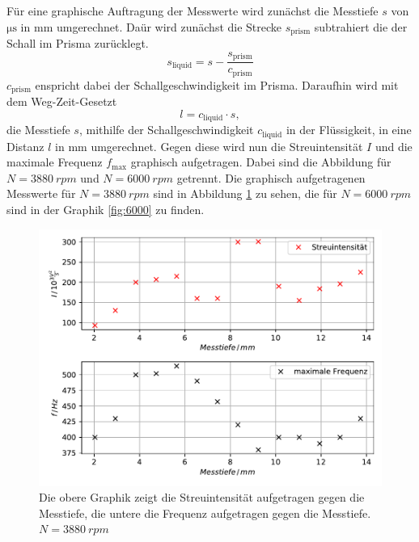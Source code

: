 Für eine graphische Auftragung der Messwerte wird zunächst die Messtiefe $s$ von $\si{\micro\second}$ in $\si{\milli\meter}$ umgerechnet.
Daür wird zunächst die Strecke $s_\text{prism}$ subtrahiert die der Schall im Prisma zurücklegt.
\begin{equation*}
 s_\text{liquid} = s - \frac{s_\text{prism}}{c_\text{prism}}
\end{equation*}
$c_\text{prism}$ enspricht dabei der Schallgeschwindigkeit im Prisma.
Daraufhin wird mit dem Weg-Zeit-Gesetzt
\begin{equation*}
l = c_\text{liquid} \cdot s,
\end{equation*}
die Messtiefe $s$, mithilfe der Schallgeschwindigkeit $c_\text{liquid}$ in der Flüssigkeit, in eine Distanz $l$ in $\si{\milli\meter}$ umgerechnet.
Gegen diese wird nun die Streuintensität $I$ und die maximale Frequenz $f_\text{max}$ graphisch aufgetragen.
Dabei sind die Abbildung für $N = \SI{3880}{rpm}$ und $N = \SI{6000}{rpm}$ getrennt.
Die graphisch aufgetragenen Messwerte für $N = \SI{3880}{rpm}$ sind in Abbildung \ref{fig:3880} zu sehen, die für $N = \SI{6000}{rpm}$ sind in der Graphik \ref{fig:6000} zu finden.

\begin{figure}
    \centering
    \includegraphics[width=\textwidth]{content/data/depth_3880.pdf}
    \caption{Die obere Graphik zeigt die Streuintensität aufgetragen gegen die Messtiefe, die untere die Frequenz aufgetragen gegen die Messtiefe. $N=\SI{3880}{rpm}$}
    \label{fig:3880}
\end{figure}

